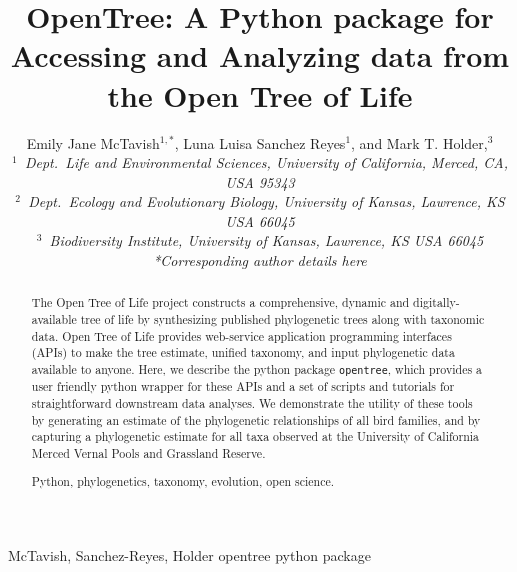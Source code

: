 \documentclass[oupdraft]{sysbio_sse}
\begin{document}
\title{OpenTree: A Python package for Accessing and Analyzing data from the Open Tree of Life}

\author{Emily Jane McTavish$^{1,\ast}$, Luna Luisa Sanchez Reyes$^{1}$, and
Mark T. Holder,$^{3}$\\[4pt]
\textit{$^{1}$~Dept.~Life and Environmental Sciences, University of California, Merced, CA, USA 95343}
\\
\textit{$^{2}$~Dept.~Ecology and Evolutionary Biology, University of Kansas, Lawrence, KS USA 66045}\\
\textit{$^{3}$~Biodiversity Institute, University of Kansas, Lawrence, KS USA 66045}
\\[2pt]
\textit{*Corresponding author details here}}

\markboth%
{McTavish, Sanchez-Reyes, Holder}
{opentree python package}

\maketitle

\begin{abstract}
{The Open Tree of Life project constructs a comprehensive, dynamic and digitally-available tree of life by synthesizing published phylogenetic trees along with taxonomic data.
Open Tree of Life provides web-service application programming interfaces (APIs) to make the tree estimate, unified taxonomy, and input phylogenetic data available to anyone.
Here, we describe the python package \texttt{opentree}, which provides a user friendly python wrapper for these APIs and a set of scripts and tutorials for straightforward downstream data analyses.
We demonstrate the utility of these tools by generating an estimate of the phylogenetic relationships of all bird families, and by capturing a phylogenetic estimate for all taxa  observed at the University of California Merced Vernal Pools and Grassland Reserve.
}

{Python, phylogenetics, taxonomy, evolution, open science.}
\end{abstract}
\newline
\end{document}
